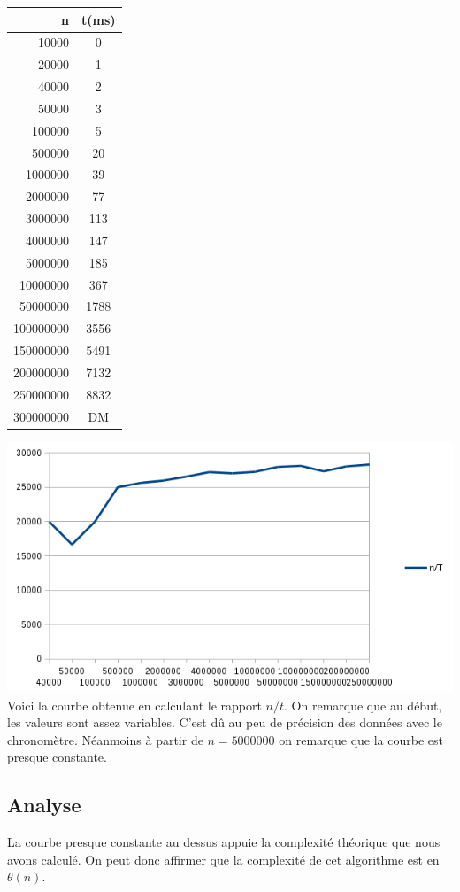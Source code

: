 \documentclass[a4paper, 12pt]{article}
\begin{document}
\begin{minipage}[c]{0.4\linewidth}
\begin{tabular}{|r|c|}
\hline
n & t(ms) \\
\hline
10000 &	0\\
20000 &	1\\
40000& 	2\\
50000 &	3\\
100000 &	5\\
500000	 & 20\\
1000000& 	39 \\
2000000&	77\\
3000000&	113\\
4000000&	147\\
5000000&	185\\
10000000&	367\\
50000000&	1788\\
100000000&	3556\\
150000000&	5491\\
200000000&	7132\\
250000000&	8832\\
300000000& DM\\
\hline
\end{tabular}
\end{minipage}\hfill
\begin{minipage}[c]{0.6\linewidth}
	\includegraphics[scale=0.6]{curve_algo_4.png}
	 	Voici la courbe obtenue en calculant le rapport $n/t$. 
		On remarque que au début, les valeurs sont assez variables. C'est dû au peu de précision des données avec le chronomètre. Néanmoins à partir de $n=5000000$ on remarque que la courbe est presque constante.
\end{minipage}
\subsection{Analyse}
La courbe presque constante au dessus appuie la complexité théorique que nous avons calculé. On peut donc affirmer que la complexité de cet algorithme est en $\theta(n)$. 
\end{document}
